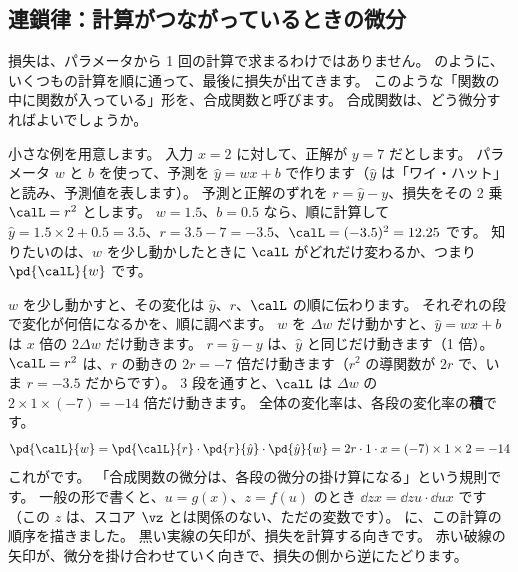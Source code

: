 \subsection*{連鎖律：計算がつながっているときの微分}

損失は、パラメータから 1 回の計算で求まるわけではありません。
のように、いくつもの計算を順に通って、最後に損失が出てきます。
このような「関数の中に関数が入っている」形を、合成関数と呼びます。
合成関数は、どう微分すればよいでしょうか。

小さな例を用意します。
入力 $x=2$ に対して、正解が $y=7$ だとします。
パラメータ $w$ と $b$ を使って、予測を $\hat{y}=wx+b$ で作ります（$\hat{y}$ は「ワイ・ハット」と読み、予測値を表します）。
予測と正解のずれを $r=\hat{y}-y$、損失をその 2 乗 $\calL=r^{2}$ とします。
$w=1.5$、$b=0.5$ なら、順に計算して $\hat{y}=1.5\times 2+0.5=3.5$、$r=3.5-7=-3.5$、$\calL=(-3.5)^{2}=12.25$ です。
知りたいのは、$w$ を少し動かしたときに $\calL$ がどれだけ変わるか、つまり $\pd{\calL}{w}$ です。

$w$ を少し動かすと、その変化は $\hat{y}$、$r$、$\calL$ の順に伝わります。
それぞれの段で変化が何倍になるかを、順に調べます。
$w$ を $\Delta w$ だけ動かすと、$\hat{y}=wx+b$ は $x$ 倍の $2\Delta w$ だけ動きます。
$r=\hat{y}-y$ は、$\hat{y}$ と同じだけ動きます（1 倍）。
$\calL=r^{2}$ は、$r$ の動きの $2r=-7$ 倍だけ動きます（$r^{2}$ の導関数が $2r$ で、いま $r=-3.5$ だからです）。
3 段を通すと、$\calL$ は $\Delta w$ の $2\times 1\times(-7)=-14$ 倍だけ動きます。
全体の変化率は、各段の変化率の\textbf{積}です。
\begin{equation}
\pd{\calL}{w}=\pd{\calL}{r}\cdot\pd{r}{\hat{y}}\cdot\pd{\hat{y}}{w}
=2r\cdot 1\cdot x=(-7)\times 1\times 2=-14
\label{eq:math-chain}
\end{equation}
これがです。
「合成関数の微分は、各段の微分の掛け算になる」という規則です。
一般の形で書くと、$u=g(x)$、$z=f(u)$ のとき $\dd{z}{x}=\dd{z}{u}\cdot\dd{u}{x}$ です（この $z$ は、スコア $\vz$ とは関係のない、ただの変数です）。
に、この計算の順序を描きました。
黒い実線の矢印が、損失を計算する向きです。
赤い破線の矢印が、微分を掛け合わせていく向きで、損失の側から逆にたどります。

